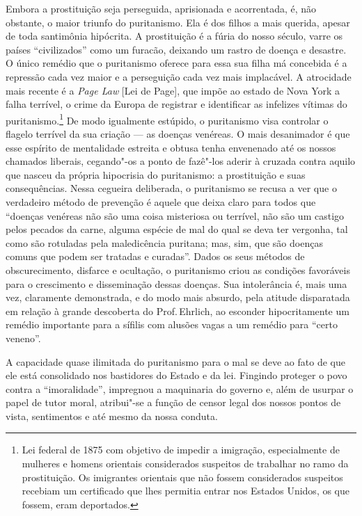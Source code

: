 Embora a prostituição seja perseguida, aprisionada e acorrentada, é, não
obstante, o maior triunfo do puritanismo. Ela é dos filhos a mais
querida, apesar de toda santimônia hipócrita. A prostituição é a
fúria do nosso século, varre os países ``civilizados'' como um furacão,
deixando um rastro de doença e desastre. O único remédio que o
puritanismo oferece para essa sua filha má concebida é a repressão cada
vez maior e a perseguição cada vez mais implacável. A atrocidade mais
recente é a \emph{Page Law} {[}Lei de Page{]}, que impõe ao estado de Nova York
a falha terrível, o crime da Europa de registrar e identificar as
infelizes vítimas do puritanismo.\footnote{Lei federal de 1875 com
  objetivo de impedir a imigração, especialmente de mulheres e homens orientais considerados suspeitos de trabalhar no ramo da prostituição.
  Os imigrantes orientais que não fossem
  considerados suspeitos recebiam um certificado que lhes permitia
  entrar nos Estados Unidos, os que fossem, eram deportados.} De modo
igualmente estúpido, o puritanismo visa controlar o flagelo terrível da
sua criação --- as doenças venéreas. O mais desanimador é que esse
espírito de mentalidade estreita e obtusa tenha envenenado até os nossos
chamados liberais, cegando"-os a ponto de fazê"-los aderir à cruzada
contra aquilo que nasceu da própria hipocrisia do puritanismo: a
prostituição e suas consequências. Nessa cegueira deliberada, o
puritanismo se recusa a ver que o verdadeiro método de prevenção é
aquele que deixa claro para todos que ``doenças venéreas não são uma
coisa misteriosa ou terrível, não são um castigo pelos pecados da carne,
alguma espécie de mal do qual se deva ter vergonha, tal como são
rotuladas pela maledicência puritana; mas, sim, que são doenças comuns
que podem ser tratadas e curadas''. Dados os seus métodos de
obscurecimento, disfarce e ocultação, o puritanismo criou as condições
favoráveis para o crescimento e disseminação dessas doenças. Sua
intolerância é, mais uma vez, claramente demonstrada, e do modo mais
absurdo, pela atitude disparatada em relação à grande descoberta do
Prof.\,Ehrlich, ao esconder hipocritamente um remédio importante para a
sífilis com alusões vagas a um remédio para ``certo veneno''.

A capacidade quase ilimitada do puritanismo para o mal se deve ao fato
de que ele está consolidado nos bastidores do Estado e da lei. Fingindo
proteger o povo contra a ``imoralidade'', impregnou a maquinaria do
governo e, além de usurpar o papel de tutor moral, atribui"-se a função de
censor legal dos nossos pontos de vista, sentimentos e até mesmo da
nossa conduta.

